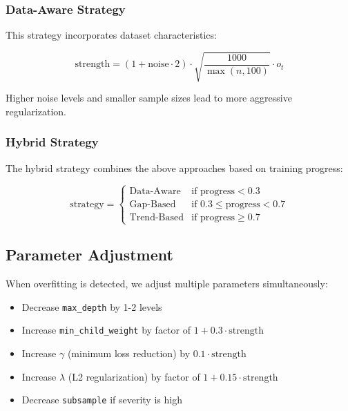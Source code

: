 \documentclass[conference]{IEEEtran}
\begin{document}
\subsubsection{Data-Aware Strategy}

This strategy incorporates dataset characteristics:

\begin{equation}
\text{strength} = (1 + \text{noise} \cdot 2) \cdot \sqrt{\frac{1000}{\max(n, 100)}} \cdot o_t
\end{equation}

Higher noise levels and smaller sample sizes lead to more aggressive regularization.

\subsubsection{Hybrid Strategy}

The hybrid strategy combines the above approaches based on training progress:

\begin{equation}
\text{strategy} = 
\begin{cases}
\text{Data-Aware} & \text{if progress} < 0.3 \\
\text{Gap-Based} & \text{if } 0.3 \leq \text{progress} < 0.7 \\
\text{Trend-Based} & \text{if progress} \geq 0.7
\end{cases}
\end{equation}

\subsection{Parameter Adjustment}

When overfitting is detected, we adjust multiple parameters simultaneously:

\begin{itemize}
    \item Decrease \texttt{max\_depth} by 1-2 levels
    \item Increase \texttt{min\_child\_weight} by factor of $1 + 0.3 \cdot \text{strength}$
    \item Increase $\gamma$ (minimum loss reduction) by $0.1 \cdot \text{strength}$
    \item Increase $\lambda$ (L2 regularization) by factor of $1 + 0.15 \cdot \text{strength}$
    \item Decrease \texttt{subsample} if severity is high
\end{itemize}
\end{document}
